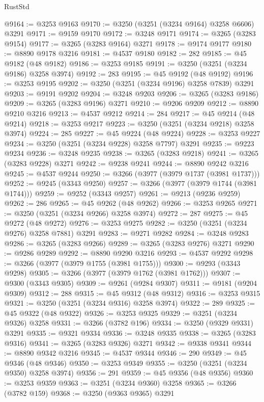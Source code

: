 \begin{lexlean}{RustStd}
\begin{coremodule}
@9164 := @3253 @9163
@9170 := @3250 (@3251 (@3234 @9164) @3258 @6606) @3291
@9171 := @9159 @9170
@9172 := @3248 @9171
@9174 := @3265 (@3283 @9154)
@9177 := @3265 (@3283 @9164) @3271
@9178 := @9174 @9177
@9180 := @8890 @9178 @3216
@9181 := @4537 @9180
@9182 := 282
@9185 := @45 @9182 (@48 @9182)
@9186 := @3253 @9185
@9191 := @3250 (@3251 (@3234 @9186) @3258 @3974)
@9192 := 283
@9195 := @45 @9192 (@48 @9192)
@9196 := @3253 @9195
@9202 := @3250 (@3251 (@3234 @9196) @3258 @7839) @3291
@9203 := @9191 @9202
@9204 := @3248 @9203
@9206 := @3265 (@3283 @9186)
@9209 := @3265 (@3283 @9196) @3271
@9210 := @9206 @9209
@9212 := @8890 @9210 @3216
@9213 := @4537 @9212
@9214 := 284
@9217 := @45 @9214 (@48 @9214)
@9218 := @3253 @9217
@9223 := @3250 (@3251 (@3234 @9218) @3258 @3974)
@9224 := 285
@9227 := @45 @9224 (@48 @9224)
@9228 := @3253 @9227
@9234 := @3250 (@3251 (@3234 @9228) @3258 @7797) @3291
@9235 := @9223 @9234
@9236 := @3248 @9235
@9238 := @3265 (@3283 @9218)
@9241 := @3265 (@3283 @9228) @3271
@9242 := @9238 @9241
@9244 := @8890 @9242 @3216
@9245 := @4537 @9244
@9250 := @3266 (@3977 (@3979 @1737 (@3981 @1737)))
@9252 := @9245 (@3343 @9250)
@9257 := @3266 (@3977 (@3979 @1744 (@3981 @1744)))
@9259 := @9252 (@3343 @9257)
@9261 := @9213 (@9236 @9259)
@9262 := 286
@9265 := @45 @9262 (@48 @9262)
@9266 := @3253 @9265
@9271 := @3250 (@3251 (@3234 @9266) @3258 @3974)
@9272 := 287
@9275 := @45 @9272 (@48 @9272)
@9276 := @3253 @9275
@9282 := @3250 (@3251 (@3234 @9276) @3258 @7881) @3291
@9283 := @9271 @9282
@9284 := @3248 @9283
@9286 := @3265 (@3283 @9266)
@9289 := @3265 (@3283 @9276) @3271
@9290 := @9286 @9289
@9292 := @8890 @9290 @3216
@9293 := @4537 @9292
@9298 := @3266 (@3977 (@3979 @1755 (@3981 @1755)))
@9300 := @9293 (@3343 @9298)
@9305 := @3266 (@3977 (@3979 @1762 (@3981 @1762)))
@9307 := @9300 (@3343 @9305)
@9309 := @9261 (@9284 @9307)
@9311 := @9181 (@9204 @9309)
@9312 := 288
@9315 := @45 @9312 (@48 @9312)
@9316 := @3253 @9315
@9321 := @3250 (@3251 (@3234 @9316) @3258 @3974)
@9322 := 289
@9325 := @45 @9322 (@48 @9322)
@9326 := @3253 @9325
@9329 := @3251 (@3234 @9326) @3258
@9331 := @3266 (@3782 @196)
@9334 := @3250 (@9329 @9331) @3291
@9335 := @9321 @9334
@9336 := @3248 @9335
@9338 := @3265 (@3283 @9316)
@9341 := @3265 (@3283 @9326) @3271
@9342 := @9338 @9341
@9344 := @8890 @9342 @3216
@9345 := @4537 @9344
@9346 := 290
@9349 := @45 @9346 (@48 @9346)
@9350 := @3253 @9349
@9355 := @3250 (@3251 (@3234 @9350) @3258 @3974)
@9356 := 291
@9359 := @45 @9356 (@48 @9356)
@9360 := @3253 @9359
@9363 := @3251 (@3234 @9360) @3258
@9365 := @3266 (@3782 @159)
@9368 := @3250 (@9363 @9365) @3291

\end{coremodule}
\end{lexlean}
